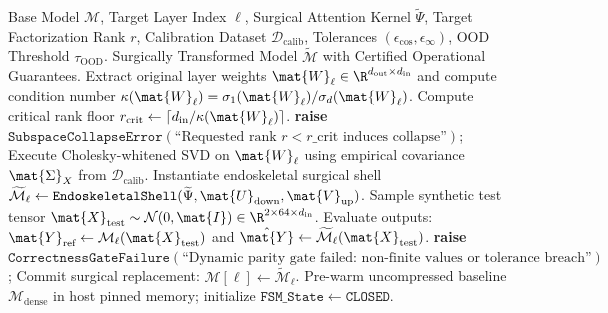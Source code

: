 \begin{algorithm}[t]
\caption[Automated Surgical Verification and In-Flight OOD Circuit Breaking Protocol]{Automated Surgical Verification and In-Flight OOD Circuit Breaking Protocol}
\label{alg:surgical_verification}
\begin{algorithmic}[1]
\REQUIRE Base Model $\mathcal{M}$, Target Layer Index $\ell$, Surgical Attention Kernel $\widetilde{\Psi}$, Target Factorization Rank $r$, Calibration Dataset $\mathcal{D}_{\text{calib}}$, Tolerances $(\epsilon_{\cos}, \epsilon_{\infty})$, OOD Threshold $\tau_{\text{OOD}}$.
\ENSURE Surgically Transformed Model $\widetilde{\mathcal{M}}$ with Certified Operational Guarantees.
\STATE {}
\STATE Extract original layer weights $\mat{W}_{\ell} \in \R^{d_{\text{out}} \times d_{\text{in}}}$ and compute condition number $\kappa(\mat{W}_\ell) = \sigma_1(\mat{W}_\ell)/\sigma_d(\mat{W}_\ell)$.
\STATE Compute critical rank floor $r_{\text{crit}} \leftarrow \lceil d_{\text{in}} / \kappa(\mat{W}_\ell) \rceil$.
    \STATE \textbf{raise} $\mathtt{SubspaceCollapseError}(\text{``Requested rank $r < r\_{\text{crit}}$ induces collapse''})$;
\ENDIF
\STATE {}
\STATE Execute Cholesky-whitened SVD on $\mat{W}_\ell$ using empirical covariance $\mat{\Sigma}_X$ from $\mathcal{D}_{\text{calib}}$.
\STATE Instantiate endoskeletal surgical shell $\widetilde{\mathcal{M}}_\ell \leftarrow \mathtt{EndoskeletalShell}(\widetilde{\Psi}, \mat{U}_{\text{down}}, \mat{V}_{\text{up}})$.
\STATE Sample synthetic test tensor $\mat{X}_{\text{test}} \sim \mathcal{N}(0, \mat{I}) \in \R^{2 \times 64 \times d_{\text{in}}}$.
\STATE Evaluate outputs: $\mat{Y}_{\text{ref}} \leftarrow \mathcal{M}_\ell(\mat{X}_{\text{test}})$ and $\hat{\mat{Y}} \leftarrow \widetilde{\mathcal{M}}_\ell(\mat{X}_{\text{test}})$.
    \STATE \textbf{raise} $\mathtt{CorrectnessGateFailure}(\text{``Dynamic parity gate failed: non-finite values or tolerance breach''})$;
\ENDIF
\STATE Commit surgical replacement: $\mathcal{M}[\ell] \leftarrow \widetilde{\mathcal{M}}_\ell$.
\STATE {}
\STATE Pre-warm uncompressed baseline $\mathcal{M}_{\text{dense}}$ in host pinned memory; initialize $\mathtt{FSM\_State} \leftarrow \mathtt{CLOSED}$.

\end{algorithmic}
\end{algorithm}
